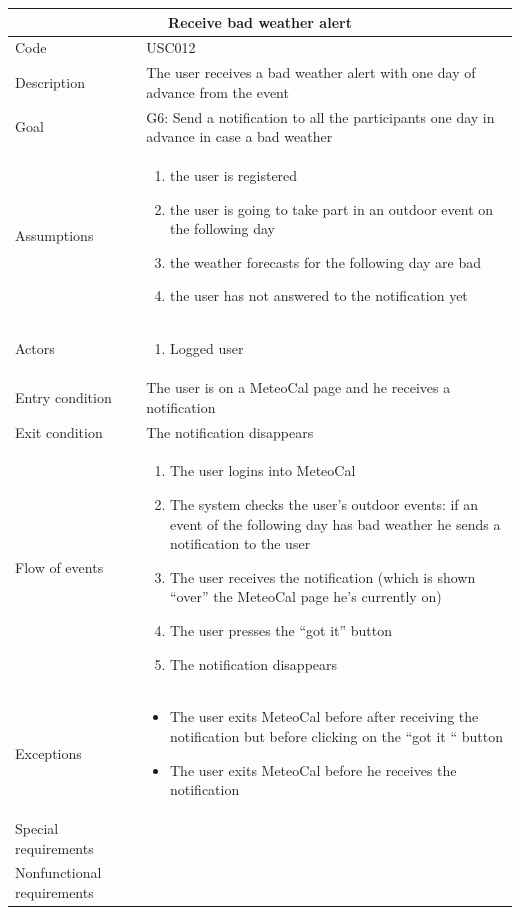 \documentclass[10pt,a4paper,titlepage]{article}
\begin{document}
\begin{tabular}[h]{| p{3cm} | p{10cm} |} 
\hline \multicolumn{2}{|c|}{\textbf{Receive bad weather alert}} \\  
\hline Code & USC012\\  
\hline Description & The user receives a bad weather alert with one day of advance from the event\\ 
\hline Goal & G6: Send a notification to all the participants one day in advance in case a bad weather\\ 
\hline Assumptions  & \begin{enumerate} 
\item the user is registered
\item the user is going to take part in an outdoor event on the following day 
\item the weather forecasts for the following day are bad
\item the user has not answered to the notification yet
\end{enumerate} \\ 
\hline Actors &  \begin{enumerate} 
\item Logged user
\end{enumerate} \\ 
\hline Entry condition & The user is on a MeteoCal page and he receives a notification\\ 
\hline Exit condition & The notification disappears\\ 
\hline Flow of events & \begin{enumerate} 
\item The user logins into MeteoCal
\item The system checks the user's outdoor events: if an event of the following day has bad weather he sends a notification to the user
\item The user receives the notification (which is shown “over” the MeteoCal page he's currently on)
\item The user presses the “got it” button
\item The notification disappears
\end{enumerate}\\ 
\hline Exceptions & \begin{itemize}
\item The user exits MeteoCal before after receiving the notification but before clicking on the “got it “ button
\item The user exits MeteoCal before he receives the notification
\end{itemize}\\ 
\hline Special requirements & \\ 
\hline Nonfunctional requirements & \\
\hline 
\end{tabular} 
\end{document}
